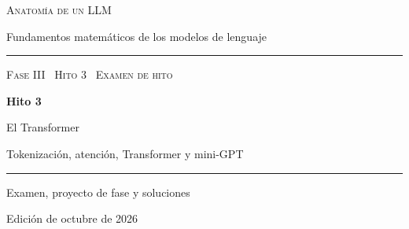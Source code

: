 \documentclass[11pt,a4paper,twoside,openany]{book}
\begin{document}
\frontmatter
\begin{titlepage}
\centering
\vspace*{2.5cm}
{\large\scshape Anatomía de un LLM}\par
\vspace{0.4cm}
{\normalsize Fundamentos matemáticos de los modelos de lenguaje}\par
\vspace{2.2cm}
\rule{\textwidth}{0.8pt}\par\vspace{0.5cm}
{\small\scshape Fase III \textperiodcentered\ Hito 3 \textperiodcentered\ Examen de hito}\par\vspace{0.3cm}
{\Huge\bfseries Hito 3\par}\vspace{0.3cm}
{\LARGE El Transformer\par}
\vspace{0.3cm}
{\large Tokenización, atención, Transformer y mini-GPT\par}
\vspace{0.5cm}\rule{\textwidth}{0.4pt}\par
\vspace{1.6cm}
{\large Examen, proyecto de fase y soluciones}\par
\vfill
{\small Edición de octubre de 2026}\par
\end{titlepage}



\tableofcontents

\mainmatter




\appendix



\backmatter

\end{document}
